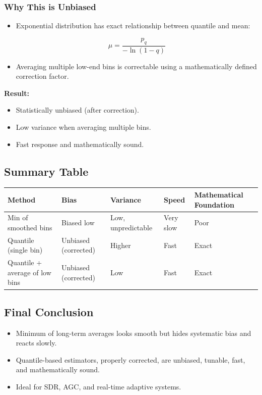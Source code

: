 \subsubsection*{Why This is Unbiased}

\begin{itemize}
\item Exponential distribution has exact relationship between quantile and mean:

\[
\mu = \frac{p_q}{-\ln(1 - q)}
\]

\item Averaging multiple low-end bins is correctable using a mathematically defined correction factor.
\end{itemize}

\textbf{Result:}
\begin{itemize}
\item Statistically unbiased (after correction).
\item Low variance when averaging multiple bins.
\item Fast response and mathematically sound.
\end{itemize}

\subsection*{Summary Table}

\begin{tabular}{|l|l|l|l|l|}
\hline
Method & Bias & Variance & Speed & Mathematical Foundation \\
\hline
Min of smoothed bins & Biased low & Low, unpredictable & Very slow & Poor \\
Quantile (single bin) & Unbiased (corrected) & Higher & Fast & Exact \\
Quantile + average of low bins & Unbiased (corrected) & Low & Fast & Exact \\
\hline
\end{tabular}

\subsection*{Final Conclusion}

\begin{itemize}
\item Minimum of long-term averages looks smooth but hides systematic bias and reacts slowly.
\item Quantile-based estimators, properly corrected, are unbiased, tunable, fast, and mathematically sound.
\item Ideal for SDR, AGC, and real-time adaptive systems.
\end{itemize}
